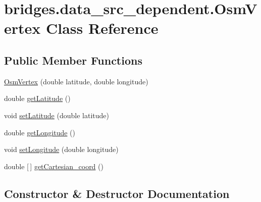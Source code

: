 \hypertarget{classbridges_1_1data__src__dependent_1_1_osm_vertex}{}\section{bridges.\+data\+\_\+src\+\_\+dependent.\+Osm\+Vertex Class Reference}
\label{classbridges_1_1data__src__dependent_1_1_osm_vertex}
\subsection*{Public Member Functions}
\begin{DoxyCompactItemize}
\item 
\mbox{\hyperlink{classbridges_1_1data__src__dependent_1_1_osm_vertex_aa95185eb1ced2e59ebf3cf9cb64773ed}{Osm\+Vertex}} (double latitude, double longitude)
\item 
double \mbox{\hyperlink{classbridges_1_1data__src__dependent_1_1_osm_vertex_a6da7cbbd1f3d686af9974d5769d4a245}{get\+Latitude}} ()
\item 
void \mbox{\hyperlink{classbridges_1_1data__src__dependent_1_1_osm_vertex_afda8504609680c855ea81f0c679298e9}{set\+Latitude}} (double latitude)
\item 
double \mbox{\hyperlink{classbridges_1_1data__src__dependent_1_1_osm_vertex_a73ce32c2897be14aa893822ce4081f3d}{get\+Longitude}} ()
\item 
void \mbox{\hyperlink{classbridges_1_1data__src__dependent_1_1_osm_vertex_a2b4ac472641b5b206cff7db53ce3285b}{set\+Longitude}} (double longitude)
\item 
double \mbox{[}$\,$\mbox{]} \mbox{\hyperlink{classbridges_1_1data__src__dependent_1_1_osm_vertex_ab0921714d93d0fc416657e39a90c404e}{get\+Cartesian\+\_\+coord}} ()
\end{DoxyCompactItemize}


\subsection{Constructor \& Destructor Documentation}
\mbox{\label{classbridges_1_1data__src__dependent_1_1_osm_vertex_aa95185eb1ced2e59ebf3cf9cb64773ed}} 
